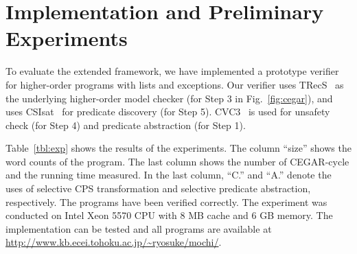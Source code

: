 \vspace{-2mm}

\section{Implementation and Preliminary Experiments}
\label{sec:experiments}

\vspace{-1mm}

To evaluate the extended framework, we have implemented a prototype
verifier for higher-order programs with lists and exceptions.
Our verifier uses TRecS~\cite{KobayashiPOPL2009,KobayashiPPDP2009} as
the underlying higher-order model checker (for Step 3 in
Fig.~\ref{fig:cegar}), and uses CSIsat~\cite{Beyer2008} for predicate
discovery (for Step 5).  CVC3~\cite{Barrett2007} is used for unsafety
check (for Step 4) and predicate abstraction (for Step 1).

Table~\ref{tbl:exp} shows the results of the experiments.  The column
``size'' shows the word counts of the program.  The last column shows
the number of CEGAR-cycle and the running time measured.  In the last
column, ``C.'' and ``A.'' denote the uses of selective CPS
transformation and selective predicate abstraction, respectively.  The
programs have been verified correctly.  The experiment was conducted on
Intel Xeon 5570 CPU with 8 MB cache and 6 GB memory.  The implementation
can be tested and all programs are available at
\url{http://www.kb.ecei.tohoku.ac.jp/~ryosuke/mochi/}.

